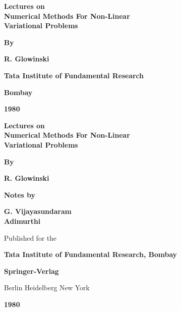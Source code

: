 \thispagestyle{empty}
\begin{center}
{\Large\bf Lectures on}\\[5pt]
{\Large\bf Numerical Methods For Non-Linear}\\[5pt] 
{\Large\bf Variational Problems}
\vskip 1cm


{\bf By}        
\medskip

{\large\bf R. Glowinski}
\vfill

{\bf Tata Institute of Fundamental Research}

{\bf Bombay}

{\bf 1980}
\end{center}

\eject

\thispagestyle{empty}
\begin{center}
{\Large\bf Lectures on}\\[5pt]
{\Large\bf Numerical Methods For Non-Linear}\\[5pt]
{\Large\bf  Variational Problems}
\vskip 1cm


{\bf By}
\medskip

{\large\bf R. Glowinski}
\vfill

{\bf Notes by}
\medskip

{\large\bf G. Vijayasundaram}\\[4pt]
{\large\bf Adimurthi}
\vfill

Published for the 

{\bf Tata Institute of Fundamental Research, Bombay}

{\bf Springer-Verlag}

Berlin Heidelberg New York

{\bf 1980}
\end{center}

\eject

